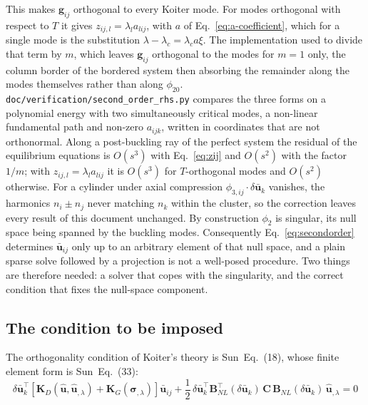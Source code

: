 \documentclass[11pt,a4paper]{article}
\begin{document}
\noindent This makes $\boldsymbol{g}_{ij}$ orthogonal to every Koiter mode.
For modes orthogonal with respect to $T$ it gives $z_{ij,l} = \lambda_l
a_{lij}$, with $a$ of Eq.~\ref{eq:a-coefficient}, which for a single mode is
the substitution $\lambda - \lambda_c = \lambda_c a\xi$.  The implementation
used to divide that term by $m$, which leaves $\boldsymbol{g}_{ij}$ orthogonal
to the modes for $m = 1$ only, the column border of the bordered system then
absorbing the remainder along the modes themselves rather than along
$\phi_{20}$.  \texttt{doc/verification/second\_order\_rhs.py} compares the
three forms on a polynomial energy with two simultaneously critical modes, a
non-linear fundamental path and non-zero $a_{ijk}$, written in coordinates
that are not orthonormal.  Along a post-buckling ray of the perfect system the
residual of the equilibrium equations is $O(s^3)$ with
Eq.~\ref{eq:zij} and $O(s^2)$ with the factor $1/m$; with $z_{ij,l} =
\lambda_l a_{lij}$ it is $O(s^3)$ for $T$-orthogonal modes and $O(s^2)$
otherwise.  For a cylinder under axial compression
$\phi_{3,ij}\cdot\delta\boldsymbol{\bar{u}}_k$ vanishes, the harmonics
$n_i \pm n_j$ never matching $n_k$ within the cluster, so the correction
leaves every result of this document unchanged.  By construction $\phi_2$ is
singular, its null space being spanned by the buckling modes.  Consequently
Eq.~\ref{eq:secondorder} determines $\boldsymbol{\bar{u}}_{ij}$ only up to an
arbitrary element of that null space, and a plain sparse solve followed by a
projection is not a well-posed procedure.  Two things are therefore needed: a
solver that copes with the singularity, and the correct condition that fixes
the null-space component.

\subsection{The condition to be imposed}

The orthogonality condition of Koiter's theory is Sun~Eq.~(18), whose finite
element form is Sun~Eq.~(33):
\begin{equation}\label{eq:sun33}
	\delta\boldsymbol{\bar{u}}_k^\top
	\left[ \boldsymbol{K}_D(\boldsymbol{\hat{u}},\boldsymbol{\hat{u}}_{,\lambda})
	+ \boldsymbol{K}_G(\boldsymbol{\sigma}_{,\lambda}) \right]
	\boldsymbol{\bar{u}}_{ij}
	+ \frac{1}{2}\,
	\delta\boldsymbol{\bar{u}}_k^\top
	\boldsymbol{B}_{NL}^\top(\delta\boldsymbol{\bar{u}}_k)\,\boldsymbol{C}\,
	\boldsymbol{B}_{NL}(\delta\boldsymbol{\bar{u}}_k)\,
	\boldsymbol{\hat{u}}_{,\lambda} = 0
\end{equation}
\end{document}
